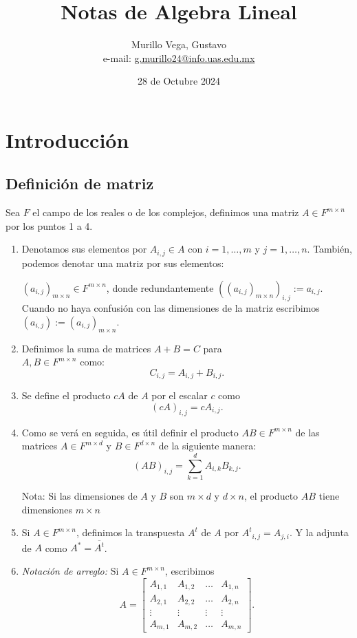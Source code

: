 \documentclass{article}
\title{Notas de Algebra Lineal}
\author{Murillo Vega, Gustavo \\ e-mail:
\href{mailto:g.murillo24@info.uas.edu.mx}{g.murillo24@info.uas.edu.mx}}
\date{28 de Octubre 2024}
\begin{document}
\maketitle

\section{Introducción}
\subsection{Definición de matriz}
Sea ${F}$ el campo de los reales o de los complejos, definimos una matriz $A\in {F}^{m\times n}$ por los puntos 1 a 4.
\begin{enumerate}
    \item Denotamos sus elementos por $A_{i,j}\in A$ con  $i=1,\ldots,m$ y $j=1,\ldots,n$. También, podemos denotar una matriz por sus elementos:
    
    $(a_{i,j})_{m\times n} \in {F}^{m\times n}$, donde redundantemente $((a_{i,j})_{m\times n})_{i,j} := a_{i,j}$.\\
    Cuando no haya confusión con las dimensiones de la matriz
    escribimos\\ $(a_{i,j}) := (a_{i,j})_{m\times n}$.
    
    \item Definimos la suma de matrices $A+B = C$ para
    \\ $A, B \in {F}^{m\times n}$ como:
    $$C_{i,j}=A_{i,j} + B_{i,j}.$$

    \item Se define el producto $cA$ de $A$ por el escalar $c$
    como $$(cA)_{i,j} = cA_{i,j}.$$
    
    \item Como se verá en seguida, es útil definir el producto
    $AB\in {F}^{m\times n}$ de las matrices $A\in {F}^{m\times d}$ y
    $B \in {F}^{d\times n}$ de la siguiente manera:
    $$(AB)_{i,j} = \sum^d_{k=1} A_{i,k} B_{k,j}.$$
    
    Nota: Si las dimensiones de $A$ y $B$ son $m\times d$
    y $d\times n$, el producto $AB$ tiene dimensiones $m\times n$

    \item Si $A\in F^{m\times n}$, definimos la transpuesta $A^t$
    de $A$ por ${A^t}_{i,j} = A_{j,i}$.
    Y la adjunta de $A$ como $A^* = \overline{A^t}$.

    \item \textit{Notación de arreglo:} Si
    $A\in {F}^{m\times n}$, escribimos
    $$A = \begin{bmatrix}
        A_{1,1} & A_{1,2} & \ldots & A_{1, n} \\
        A_{2,1} & A_{2,2} & \ldots & A_{2, n} \\
        \vdots & \vdots & \vdots & \vdots \\
        A_{m,1} & A_{m,2} & \ldots & A_{m, n}
    \end{bmatrix}.$$
\end{enumerate}
\end{document}
